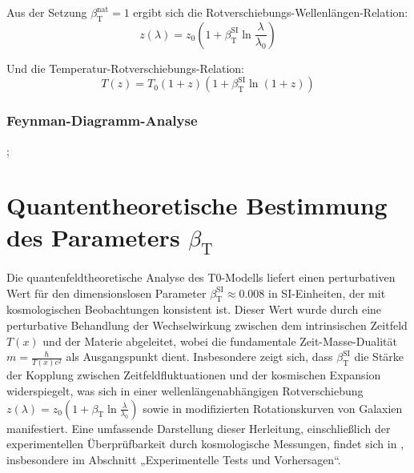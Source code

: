 \documentclass[12pt,a4paper]{article}
\newcommand{\Tfield}{T(x)}
\newcommand{\betaT}{\beta_{\text{T}}}
\begin{document}
	Aus der Setzung \(\betaT^{\text{nat}} = 1\) ergibt sich die Rotverschiebungs-Wellenlängen-Relation:
	\begin{equation}
		z(\lambda) = z_0 \left(1 + \betaT^{\text{SI}} \ln \frac{\lambda}{\lambda_0}\right)
	\end{equation}
	
	Und die Temperatur-Rotverschiebungs-Relation:
	\begin{equation}
		T(z) = T_0 (1 + z) (1 + \betaT^{\text{SI}} \ln(1 + z))
	\end{equation}
	
	\subsubsection{Feynman-Diagramm-Analyse}
	
	\begin{center}
		;
	\end{center}
	
	\section{Quantentheoretische Bestimmung des Parameters \(\betaT\)}
	
	Die quantenfeldtheoretische Analyse des T0-Modells liefert einen perturbativen Wert für den dimensionslosen Parameter \(\betaT^{\text{SI}} \approx 0.008\) in SI-Einheiten, der mit kosmologischen Beobachtungen konsistent ist. Dieser Wert wurde durch eine perturbative Behandlung der Wechselwirkung zwischen dem intrinsischen Zeitfeld \(\Tfield\) und der Materie abgeleitet, wobei die fundamentale Zeit-Masse-Dualität \(m = \frac{\hbar}{\Tfield c^2}\) als Ausgangspunkt dient. Insbesondere zeigt sich, dass \(\betaT^{\text{SI}}\) die Stärke der Kopplung zwischen Zeitfeldfluktuationen und der kosmischen Expansion widerspiegelt, was sich in einer wellenlängenabhängigen Rotverschiebung \(z(\lambda) = z_0 \left(1 + \betaT \ln \frac{\lambda}{\lambda_0}\right)\) sowie in modifizierten Rotationskurven von Galaxien manifestiert. Eine umfassende Darstellung dieser Herleitung, einschließlich der experimentellen Überprüfbarkeit durch kosmologische Messungen, findet sich in \cite{pascher_emergente_gravitation_2025}, insbesondere im Abschnitt „Experimentelle Tests und Vorhersagen“.
	
\end{document}

